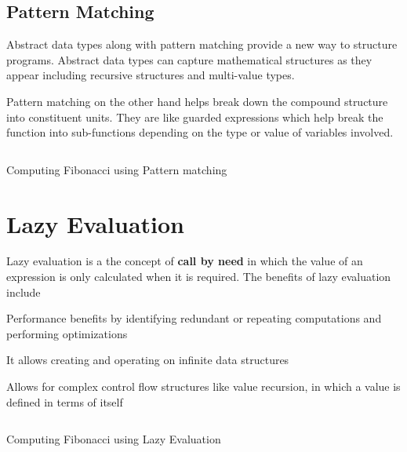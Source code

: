 \subsection{Pattern Matching}
Abstract data types along with pattern matching provide a new way to structure programs.
Abstract data types can capture mathematical structures as they appear including recursive structures and multi-value types.

Pattern matching on the other hand helps break down the compound structure into constituent units.
They are like guarded expressions which help break the function into sub-functions depending on the type or value of variables involved.
\begin{listing}
\inputminted{haskell}{hs/fibonacci1.hs}
\caption{Computing Fibonacci using Pattern matching}
\end{listing}


\section{Lazy Evaluation}
Lazy evaluation is a the concept of \textbf{call by need} in which the value of an expression is only calculated when it is required.
The benefits of lazy evaluation include
\begin{packed_itemize}
\item Performance benefits by identifying redundant or repeating computations and performing optimizations
\item It allows creating and operating on infinite data structures
\item Allows for complex control flow structures like value recursion, in which a value is defined in terms of itself
\end{packed_itemize}

\begin{listing}
\inputminted{literate-haskell}{hs/fibonacci.lhs}
\caption{Computing Fibonacci using Lazy Evaluation}
\end{listing}

